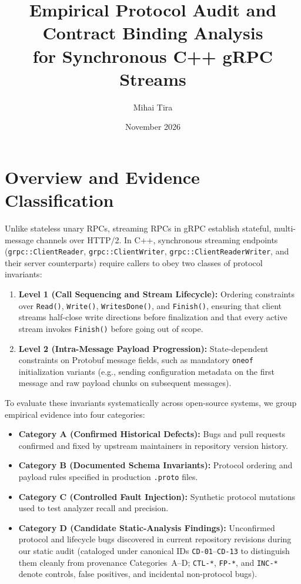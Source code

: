 \documentclass[11pt,a4paper]{article}
\title{Empirical Protocol Audit and Contract Binding Analysis\\
for Synchronous C++ gRPC Streams}
\author{Mihai Tira}
\date{November 2026}
\begin{document}
\maketitle

\section{Overview and Evidence Classification}

Unlike stateless unary RPCs, streaming RPCs in gRPC establish stateful, multi-message channels over HTTP/2. In C++, synchronous streaming endpoints (\texttt{grpc::ClientReader}, \texttt{grpc::ClientWriter}, \texttt{grpc::ClientReaderWriter}, and their server counterparts) require callers to obey two classes of protocol invariants:
\begin{enumerate}
    \item \textbf{Level 1 (Call Sequencing and Stream Lifecycle):} Ordering constraints over \texttt{Read()}, \texttt{Write()}, \texttt{WritesDone()}, and \texttt{Finish()}, ensuring that client streams half-close write directions before finalization and that every active stream invokes \texttt{Finish()} before going out of scope.
    \item \textbf{Level 2 (Intra-Message Payload Progression):} State-dependent constraints on Protobuf message fields, such as mandatory \texttt{oneof} initialization variants (e.g., sending configuration metadata on the first message and raw payload chunks on subsequent messages).
\end{enumerate}

To evaluate these invariants systematically across open-source systems, we group empirical evidence into four categories:
\begin{itemize}
    \item \textbf{Category A (Confirmed Historical Defects):} Bugs and pull requests confirmed and fixed by upstream maintainers in repository version history.
    \item \textbf{Category B (Documented Schema Invariants):} Protocol ordering and payload rules specified in production \texttt{.proto} files.
    \item \textbf{Category C (Controlled Fault Injection):} Synthetic protocol mutations used to test analyzer recall and precision.
    \item \textbf{Category D (Candidate Static-Analysis Findings):} Unconfirmed protocol and lifecycle bugs discovered in current repository revisions during our static audit (cataloged under canonical IDs \texttt{CD-01}--\texttt{CD-13} to distinguish them cleanly from provenance Categories~A--D; \texttt{CTL-*}, \texttt{FP-*}, and \texttt{INC-*} denote controls, false positives, and incidental non-protocol bugs).
\end{itemize}
\end{document}
